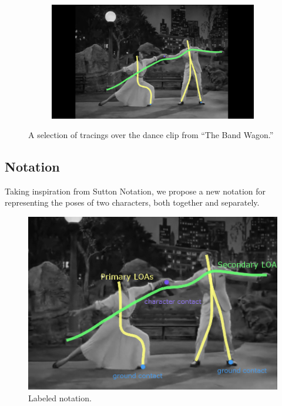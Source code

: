 \begin{figure}[h!]
\begin{subfigure}[b!]{0.31\textwidth}
                \label{fig:pose2}
        \end{subfigure}%
        \quad
        \begin{subfigure}[b!]{0.31\textwidth}
        	\centering
                \includegraphics[width=\linewidth]{img/keyframe_case_7_(4)}
                \label{fig:pose3}
        \end{subfigure}%
	\caption{A selection of tracings over the dance clip from ``The Band Wagon.''}
	\label{fig:tracing}
\end{figure}

\newpage

\subsection{Notation}
Taking inspiration from Sutton Notation, we propose a new notation for representing the poses of two characters, both together and separately. 

\begin{figure}[H]
\centering
\includegraphics[scale=0.7]{img/labelednotation}
\caption{Labeled notation.}
\end{figure}

